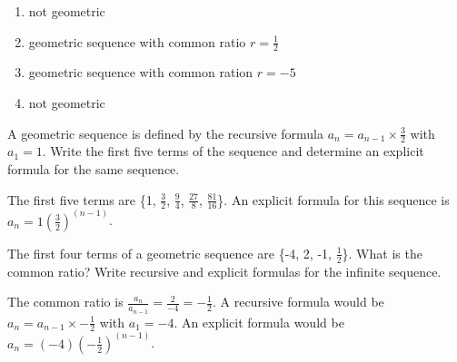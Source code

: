 \begin{Answer}[ref=seq4]
\begin{enumerate}
\item not geometric
\item geometric sequence with common ratio $r = \frac{1}{2}$
\item geometric sequence with common ration $r = -5$
\item not geometric
\end{enumerate}
\end{Answer}

\begin{Exercise}[label=seq5]
A geometric sequence is defined by the recursive formula $a_n = a_{n-1} \times \frac{3}{2}$ with $a_1 = 1$. Write the first five terms of the sequence and determine an explicit formula for the same sequence. 
\end{Exercise}

\begin{Answer}[ref=seq5]
The first five terms are \{1, $\frac{3}{2}$, $\frac{9}{4}$, $\frac{27}{8}$, $\frac{81}{16}$\}. An explicit formula for this sequence is $a_n = 1(\frac{3}{2})^{(n-1)}$. 
\end{Answer}

\begin{Exercise}[label=seq6]
The first four terms of a geometric sequence are \{-4, 2, -1, $\frac{1}{2}$\}. What is the common ratio? Write recursive and explicit formulas for the infinite sequence. 
\end{Exercise}

\begin{Answer}[ref=seq6]
The common ratio is $\frac{a_{n}}{a_{n-1}} = \frac{2}{-4} = -\frac{1}{2}$. A recursive formula would be $a_n = a_{n-1} \times -\frac{1}{2}$ with $a_1 = -4$. An explicit formula would be $a_n = (-4)(-\frac{1}{2})^{(n-1)}$. 
\end{Answer}

















